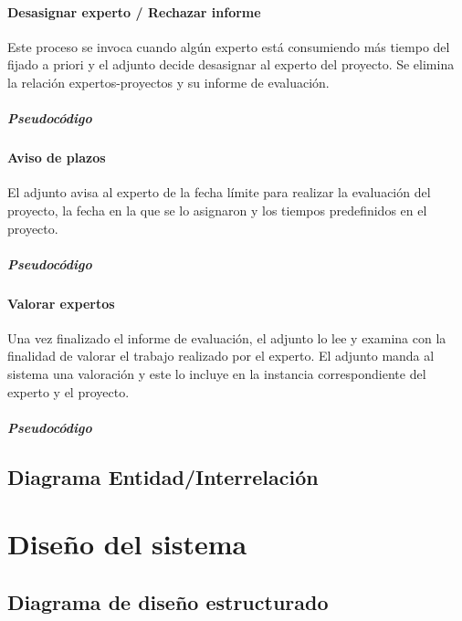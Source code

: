 \documentclass[12pt,a4paper,spanish,twoside]{book}
\begin{document}
\subsection{Desasignar experto / Rechazar informe}
Este proceso se invoca cuando algún experto está consumiendo más tiempo del 
fijado a priori y el adjunto decide desasignar al experto del proyecto. Se 
elimina la relación expertos-proyectos y su informe de evaluación.

\subsubsection{Pseudocódigo}

\subsection{Aviso de plazos}
El adjunto avisa al experto de la fecha límite para realizar la evaluación del 
proyecto, la fecha en la que se lo asignaron y los tiempos predefinidos en el 
proyecto.

\subsubsection{Pseudocódigo}

\subsection{Valorar expertos}
Una vez finalizado el informe de evaluación, el adjunto lo lee y examina con la 
finalidad de valorar el trabajo realizado por el experto. El adjunto manda al
sistema una valoración y este lo incluye en la instancia correspondiente del 
experto y el proyecto.

\subsubsection{Pseudocódigo}

\chapter{Diagrama Entidad/Interrelación}

\part{Diseño del sistema}
\chapter{Diagrama de diseño estructurado}
\end{document}
